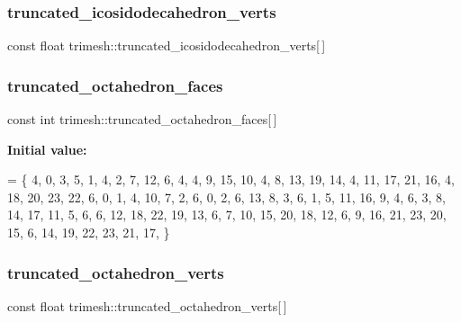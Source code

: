 \mbox{\label{namespacetrimesh_ae5bcb75c2f03f0b8a066f545a7f306e2}} 
\subsubsection{\texorpdfstring{truncated\+\_\+icosidodecahedron\+\_\+verts}{truncated\_icosidodecahedron\_verts}}
{\footnotesize\ttfamily const float trimesh\+::truncated\+\_\+icosidodecahedron\+\_\+verts\mbox{[}$\,$\mbox{]}\hspace{0.3cm}{\ttfamily [static]}}

\mbox{\label{namespacetrimesh_a2bd0ac5d79b519df6361b95d327d30ef}} 
\subsubsection{\texorpdfstring{truncated\+\_\+octahedron\+\_\+faces}{truncated\_octahedron\_faces}}
{\footnotesize\ttfamily const int trimesh\+::truncated\+\_\+octahedron\+\_\+faces\mbox{[}$\,$\mbox{]}\hspace{0.3cm}{\ttfamily [static]}}

{\bfseries Initial value\+:}
\begin{DoxyCode}
= \{
    4, 0, 3, 5, 1,
    4, 2, 7, 12, 6,
    4, 4, 9, 15, 10,
    4, 8, 13, 19, 14,
    4, 11, 17, 21, 16,
    4, 18, 20, 23, 22,
    6, 0, 1, 4, 10, 7, 2,
    6, 0, 2, 6, 13, 8, 3,
    6, 1, 5, 11, 16, 9, 4,
    6, 3, 8, 14, 17, 11, 5,
    6, 6, 12, 18, 22, 19, 13,
    6, 7, 10, 15, 20, 18, 12,
    6, 9, 16, 21, 23, 20, 15,
    6, 14, 19, 22, 23, 21, 17,
\}
\end{DoxyCode}
\mbox{\label{namespacetrimesh_a97b0aae7cfd95aeb64259be27ad18f31}} 
\subsubsection{\texorpdfstring{truncated\+\_\+octahedron\+\_\+verts}{truncated\_octahedron\_verts}}
{\footnotesize\ttfamily const float trimesh\+::truncated\+\_\+octahedron\+\_\+verts\mbox{[}$\,$\mbox{]}\hspace{0.3cm}{\ttfamily [static]}}

